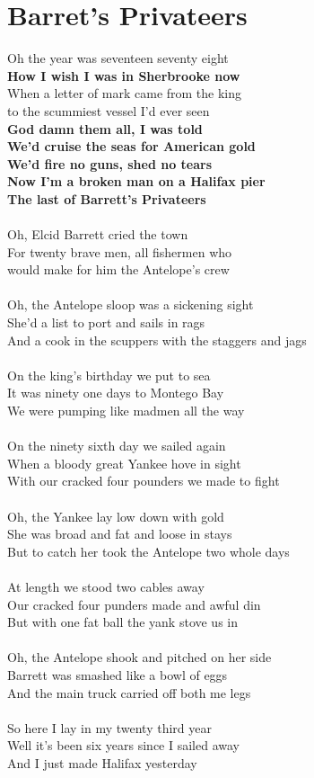 \documentclass[letterpaper,14pt]{extarticle}
\begin{document}
\section{Barret's Privateers}
\noindent
Oh the year was seventeen seventy eight
\\\textbf{How I wish I was in Sherbrooke now}
\\When a letter of mark came from the king
\\to the scummiest vessel I'd ever seen
\\\textbf{God damn them all, I was told
\\We'd cruise the seas for American gold
\\We'd fire no guns, shed no tears
\\Now I'm a broken man on a Halifax pier
\\The last of Barrett's Privateers}
\\
\\Oh, Elcid Barrett cried the town
\\For twenty brave men, all fishermen who
\\would make for him the Antelope's crew
\\
\\Oh, the Antelope sloop was a sickening sight
\\She'd a list to port and sails in rags
\\And a cook in the scuppers with the staggers and jags
\\
\\On the king's birthday we put to sea
\\It was ninety one days to Montego Bay
\\We were pumping like madmen all the way
\\
\\On the ninety sixth day we sailed again
\\When a bloody great Yankee hove in sight
\\With our cracked four pounders we made to fight
\\
\\Oh, the Yankee lay low down with gold
\\She was broad and fat and loose in stays
\\But to catch her took the Antelope two whole days
\\
\\At length we stood two cables away
\\Our cracked four punders made and awful din
\\But with one fat ball the yank stove us in
\\
\\Oh, the Antelope shook and pitched on her side
\\Barrett was smashed like a bowl of eggs
\\And the main truck carried off both me legs
\\
\\So here I lay in my twenty third year
\\Well it's been six years since I sailed away
\\And I just made Halifax yesterday
\end{document}
